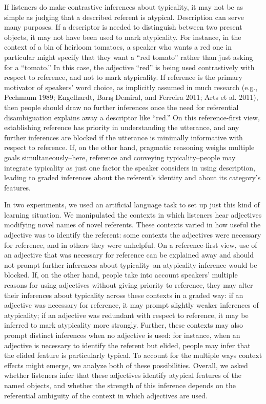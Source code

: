 \documentclass{ucetd}
\begin{document}
If listeners do make contrastive inferences about typicality, it may not
be as simple as judging that a described referent is atypical.
Description can serve many purposes. If a descriptor is needed to
distinguish between two present objects, it may not have been used to
mark atypicality. For instance, in the context of a bin of heirloom
tomatoes, a speaker who wants a red one in particular might specify that
they want a ``red tomato'' rather than just asking for a ``tomato.'' In
this case, the adjective ``red'' is being used contrastively with
respect to reference, and not to mark atypicality. If reference is the
primary motivator of speakers' word choice, as implicitly assumed in
much research (e.g., Pechmann 1989; Engelhardt, Barış Demiral, and
Ferreira 2011; Arts et al. 2011), then people should draw no further
inferences once the need for referential disambiguation explains away a
descriptor like ``red.'' On this reference-first view, establishing
reference has priority in understanding the utterance, and any further
inferences are blocked if the utterance is minimally informative with
respect to reference. If, on the other hand, pragmatic reasoning weighs
multiple goals simultaneously--here, reference and conveying
typicality--people may integrate typicality as just one factor the
speaker considers in using description, leading to graded inferences
about the referent's identity and about its category's features.

In two experiments, we used an artificial language task to set up just
this kind of learning situation. We manipulated the contexts in which
listeners hear adjectives modifying novel names of novel referents.
These contexts varied in how useful the adjective was to identify the
referent: some contexts the adjectives were necessary for reference, and
in others they were unhelpful. On a reference-first view, use of an
adjective that was necessary for reference can be explained away and
should not prompt further inferences about typicality--an atypicality
inference would be blocked. If, on the other hand, people take into
account speakers' multiple reasons for using adjectives without giving
priority to reference, they may alter their inferences about typicality
across these contexts in a graded way: if an adjective was necessary for
reference, it may prompt slightly weaker inferences of atypicality; if
an adjective was redundant with respect to reference, it may be inferred
to mark atypicality more strongly. Further, these contexts may also
prompt distinct inferences when no adjective is used: for instance, when
an adjective is necessary to identify the referent but elided, people
may infer that the elided feature is particularly typical. To account
for the multiple ways context effects might emerge, we analyze both of
these possibilities. Overall, we asked whether listeners infer that
these adjectives identify atypical features of the named objects, and
whether the strength of this inference depends on the referential
ambiguity of the context in which adjectives are used.
\end{document}
